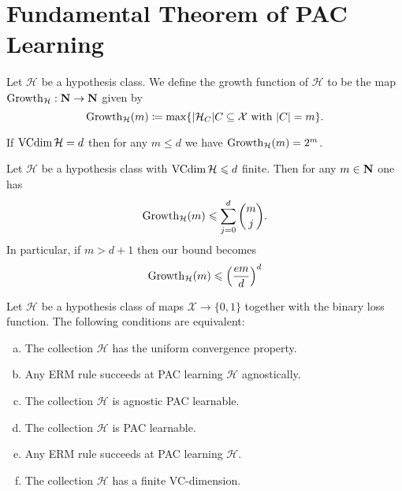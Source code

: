 \section{Fundamental Theorem of PAC Learning}

\begin{definition}
    \label{def:growth-function-learning}
    Let \(\mathcal{H}\) be a hypothesis class. We define the growth function of \(\mathcal{H}\) to be
    the map \(\operatorname{Growth}_{\mathcal{H}}: \mathbf{N} \to \mathbf{N}\) given by
    \[
        \operatorname{Growth}_{\mathcal{H}}(m) \coloneq \max \{|\mathcal{H}_C| \relax C \subseteq \mathcal{X} \text{ with } |C| = m\}.
    \]
\end{definition}

\begin{corollary}
    \label{cor:growth-function-lower-vc-dim}
    If \(\operatorname{VCdim} \mathcal{H} = d\) then for any \(m \leq d\) we have \(\operatorname{Growth}_{\mathcal{H}}(m) = 2^m\).
\end{corollary}

\begin{lemma}
    \label{lem:sauer-shelah-perles}
    Let \(\mathcal{H}\) be a hypothesis class with \(\operatorname{VCdim} \mathcal{H} \leqslant d\) finite. Then for any
    \(m \in \mathbf{N}\) one has
    \[
        \operatorname{Growth}_{\mathcal{H}}(m) \leqslant \sum_{j=0}^d \binom m j.
    \]
    In particular, if \(m > d + 1\) then our bound becomes
    \[
        \operatorname{Growth}_{\mathcal{H}}(m) \leqslant \Big(\frac{e m}{d}\Big)^d
    \]
\end{lemma}

\begin{theorem}
    \label{thm:fundamental-thm-stat-learning}
    Let \(\mathcal{H}\) be a hypothesis class of maps \(\mathcal{X} \to \{0, 1\}\) together with the
    binary loss function. The following conditions are equivalent:
    \begin{enumerate}[(a)]\setlength\itemsep{0em}
        \item The collection \(\mathcal{H}\) has the uniform convergence property.

        \item Any ERM rule succeeds at PAC learning \(\mathcal{H}\) agnostically.

        \item The collection \(\mathcal{H}\) is agnostic PAC learnable.

        \item The collection \(\mathcal{H}\) is PAC learnable.

        \item Any ERM rule succeeds at PAC learning \(\mathcal{H}\).

        \item The collection \(\mathcal{H}\) has a finite VC-dimension.
    \end{enumerate}
\end{theorem}

